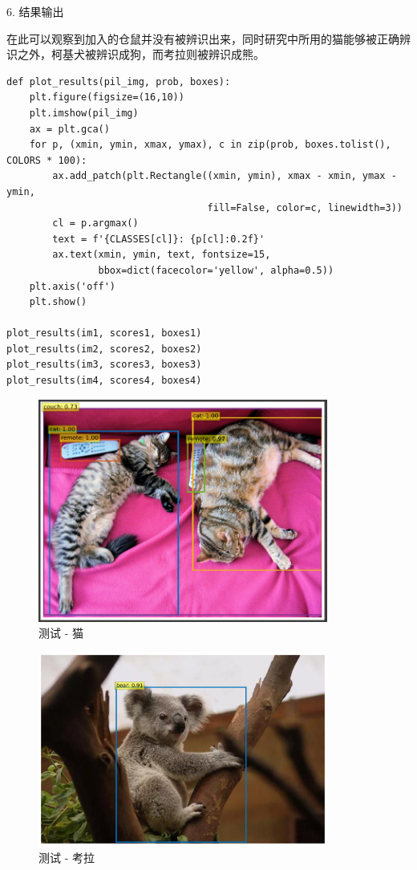 6. 结果输出

在此可以观察到加入的仓鼠并没有被辨识出来，同时研究中所用的猫能够被正确辨识之外，柯基犬被辨识成狗，而考拉则被辨识成熊。

\begin{Verbatim}
def plot_results(pil_img, prob, boxes):
    plt.figure(figsize=(16,10))
    plt.imshow(pil_img)
    ax = plt.gca()
    for p, (xmin, ymin, xmax, ymax), c in zip(prob, boxes.tolist(), COLORS * 100):
        ax.add_patch(plt.Rectangle((xmin, ymin), xmax - xmin, ymax - ymin,
                                   fill=False, color=c, linewidth=3))
        cl = p.argmax()
        text = f'{CLASSES[cl]}: {p[cl]:0.2f}'
        ax.text(xmin, ymin, text, fontsize=15,
                bbox=dict(facecolor='yellow', alpha=0.5))
    plt.axis('off')
    plt.show()
    
plot_results(im1, scores1, boxes1)
plot_results(im2, scores2, boxes2)
plot_results(im3, scores3, boxes3)
plot_results(im4, scores4, boxes4)
\end{Verbatim}

\begin{figure}[htb]
\centering 
\includegraphics[width=0.85\textwidth]{img/c4d3.png} 
\caption{测试 - 猫}
\label{Test}
\end{figure}

\begin{figure}[htb]
\centering 
\includegraphics[width=0.85\textwidth]{img/c4d4.png} 
\caption{测试 - 考拉}
\label{Test}
\end{figure}


